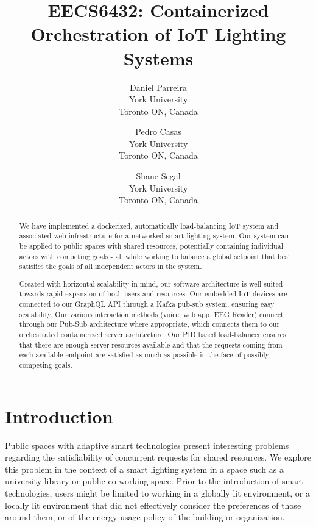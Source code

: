 \documentclass[10pt,twocolumn,letterpaper]{article}
\begin{document}
\title{EECS6432: Containerized Orchestration of IoT Lighting Systems}

\author{
  Daniel Parreira\\
  York University\\
  Toronto ON, Canada\\
  \and
  Pedro Casas\\
  York University\\
  Toronto ON, Canada\\
  \and
  Shane Segal\\
  York University\\
  Toronto ON, Canada\\
}

\maketitle

\begin{abstract}
  We have implemented a dockerized, automatically load-balancing IoT system and
  associated web-infrastructure for a networked smart-lighting system. Our
  system can be applied to public spaces with shared resources, potentially
  containing individual actors with competing goals - all while working to
  balance a global setpoint that best satisfies the goals of all independent
  actors in the system.

  Created with horizontal scalability in mind, our software architecture is
  well-suited towards rapid expansion of both users and resources. Our embedded
  IoT devices are connected to our GraphQL API through a Kafka pub-sub system,
  ensuring easy scalability. Our various interaction methods (voice, web app,
  EEG Reader) connect through our Pub-Sub architecture where appropriate, which
  connects them to our orchestrated containerized server architecture. Our PID
  based load-balancer ensures that there are enough server resources available
  and that the requests coming from each available endpoint are satisfied as
  much as possible in the face of possibly competing goals.
\end{abstract}

\section{Introduction}
Public spaces with adaptive smart technologies present interesting problems
regarding the satisfiability of concurrent requests for shared resources. We
explore this problem in the context of a smart lighting system in a space such
as a university library or public co-working space. Prior to the introduction of
smart technologies, users might be limited to working in a globally lit
environment, or a locally lit environment that did not effectively consider the
preferences of those around them, or of the energy usage policy of the building
or organization.
\end{document}
